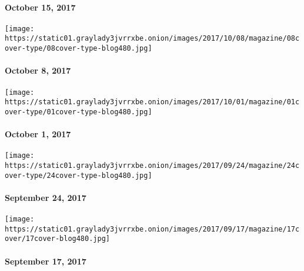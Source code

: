 \hypertarget{october-15-2017}{%
\paragraph{October 15, 2017}\label{october-15-2017}}

\href{https://www.nytimes3xbfgragh.onion/issue/magazine/2017/10/06/100817-issue}{}

\texttt{[image: https://static01.graylady3jvrrxbe.onion/images/2017/10/08/magazine/08cover-type/08cover-type-blog480.jpg]}

\hypertarget{october-8-2017}{%
\paragraph{October 8, 2017}\label{october-8-2017}}

\href{https://www.nytimes3xbfgragh.onion/issue/magazine/2017/09/29/100117-issue}{}

\texttt{[image: https://static01.graylady3jvrrxbe.onion/images/2017/10/01/magazine/01cover-type/01cover-type-blog480.jpg]}

\hypertarget{october-1-2017}{%
\paragraph{October 1, 2017}\label{october-1-2017}}

\href{https://www.nytimes3xbfgragh.onion/interactive/2017/09/21/magazine/voyages-issue-photographs-family-vacations-around-world.html}{}

\texttt{[image: https://static01.graylady3jvrrxbe.onion/images/2017/09/24/magazine/24cover-type/24cover-type-blog480.jpg]}

\hypertarget{september-24-2017}{%
\paragraph{September 24, 2017}\label{september-24-2017}}

\href{https://www.nytimes3xbfgragh.onion/issue/magazine/2017/09/15/91717-issue}{}

\texttt{[image: https://static01.graylady3jvrrxbe.onion/images/2017/09/17/magazine/17cover/17cover-blog480.jpg]}

\hypertarget{september-17-2017}{%
\paragraph{September 17, 2017}\label{september-17-2017}}

